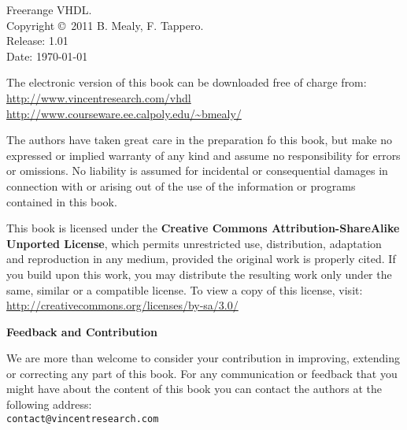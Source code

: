 %
%
%
\setcounter{page}{1}

\small
\noindent
Freerange VHDL.\\
Copyright \copyright \ 2011 B. Mealy, F. Tappero.\\
Release: 1.01\\
Date: \today
\vspace{20pt}

\noindent
The electronic version of this book can be downloaded free of charge from:\\ 
\url{http://www.vincentresearch.com/vhdl}\\
\url{http://www.courseware.ee.calpoly.edu/~bmealy/}

\vspace{20pt}

\noindent
The authors have taken great care in the preparation fo this book, but make no expressed or implied warranty of any kind and assume no responsibility for errors or omissions. No liability is assumed for incidental or consequential damages in connection with or arising out of the use of the information or programs contained in this book.

\noindent
This book is licensed under the \textbf{Creative Commons Attribution-ShareAlike Unported License}, which permits unrestricted use, distribution, adaptation and reproduction in any medium, provided the original work is properly cited. If you build upon this work, you may distribute the resulting work only under the same, similar or a compatible license. To view a copy of this license, visit:\\
\url{http://creativecommons.org/licenses/by-sa/3.0/}
\vspace{20pt}

\noindent
{\sffamily\bfseries Feedback and Contribution}

\noindent
We are more than welcome to consider your contribution in improving, extending or correcting any part of this book.
For any communication or feedback that you might have about the content of this book you can contact the authors at the following address:\\
\texttt{contact@vincentresearch.com}


